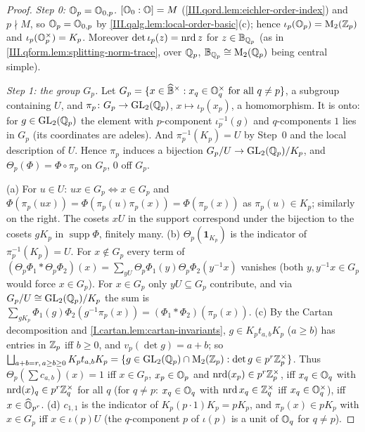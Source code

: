 \begin{theorem}
\end{theorem}
\begin{proof}
\emph{Step 0: $\mathbb{O}_p=\mathbb{O}_{0,p}$.} $[\mathbb{O}_0:\mathbb{O}]=M$ (\cref{III.qord.lem:eichler-order-index}) and $p\nmid M$, so $\mathbb{O}_p=\mathbb{O}_{0,p}$ by
\cref{III.qalg.lem:local-order-basic}(c); hence $\iota_p(\mathbb{O}_p)=\mathrm{M}_2(\mathbb{Z}_p)$ and $\iota_p(\mathbb{O}_p^\times)=K_p$. Moreover $\det\iota_p(z)=\operatorname{nrd} z$ for
$z\in\mathbb{B}_{\mathbb{Q}_p}$ (as in \cref{III.qform.lem:splitting-norm-trace}, over $\mathbb{Q}_p$, $\mathbb{B}_{\mathbb{Q}_p}\cong\mathrm{M}_2(\mathbb{Q}_p)$ being central simple).

\emph{Step 1: the group $G_p$.} Let $G_p=\{x\in\widehat{\mathbb{B}}^\times:x_q\in\mathbb{O}_q^\times\text{ for all }q\ne p\}$, a subgroup containing $U$, and
$\pi_p\colon G_p\to\mathrm{GL}_2(\mathbb{Q}_p)$, $x\mapsto\iota_p(x_p)$, a homomorphism. It is onto: for $g\in\mathrm{GL}_2(\mathbb{Q}_p)$ the element with $p$-component $\iota_p^{-1}(g)$ and
$q$-components $1$ lies in $G_p$ (its coordinates are adeles). And $\pi_p^{-1}(K_p)=U$ by Step~0 and the local description of $U$. Hence
$\pi_p$ induces a bijection $G_p/U\to\mathrm{GL}_2(\mathbb{Q}_p)/K_p$, and $\Theta_p(\Phi)=\Phi\circ\pi_p$ on $G_p$, $0$ off $G_p$.

(a) For $u\in U$: $ux\in G_p\iff x\in G_p$ and $\Phi(\pi_p(ux))=\Phi(\pi_p(u)\pi_p(x))=\Phi(\pi_p(x))$ as $\pi_p(u)\in K_p$; similarly on the right. The cosets
$xU$ in the support correspond under the bijection to the cosets $gK_p$ in $\operatorname{supp}\Phi$, finitely many. (b) $\Theta_p(\mathbf 1_{K_p})$ is the
indicator of $\pi_p^{-1}(K_p)=U$. For $x\notin G_p$ every term of $(\Theta_p\Phi_1*\Theta_p\Phi_2)(x)=\sum_{yU}\Theta_p\Phi_1(y)\Theta_p\Phi_2(y^{-1}x)$ vanishes
(both $y,y^{-1}x\in G_p$ would force $x\in G_p$). For $x\in G_p$ only $yU\subseteq G_p$ contribute, and via $G_p/U\cong\mathrm{GL}_2(\mathbb{Q}_p)/K_p$ the sum is
$\sum_{gK_p}\Phi_1(g)\Phi_2(g^{-1}\pi_p(x))=(\Phi_1*\Phi_2)(\pi_p(x))$. (c) By the Cartan decomposition and \cref{I.cartan.lem:cartan-invariants}, $g\in
K_pt_{a,b}K_p$ ($a\ge b$) has entries in $\mathbb{Z}_p$ iff $b\ge0$, and $v_p(\det g)=a+b$; so
$\bigsqcup_{a+b=r,\,a\ge b\ge0}K_pt_{a,b}K_p=\{g\in\mathrm{GL}_2(\mathbb{Q}_p)\cap\mathrm{M}_2(\mathbb{Z}_p):\det g\in p^r\mathbb{Z}_p^\times\}$. Thus $\Theta_p(\sum c_{a,b})(x)=1$ iff $x\in G_p$,
$x_p\in\mathbb{O}_p$ and $\operatorname{nrd}(x_p)\in p^r\mathbb{Z}_p^\times$, iff $x_q\in\mathbb{O}_q$ with $\operatorname{nrd}(x)_q\in p^r\mathbb{Z}_q^\times$ for all $q$ (for $q\ne p$: $x_q\in\mathbb{O}_q$ with
$\operatorname{nrd} x_q\in\mathbb{Z}_q^\times$ iff $x_q\in\mathbb{O}_q^\times$), iff $x\in\widehat{\mathbb{O}}_{p^r}$. (d) $c_{1,1}$ is the indicator of $K_p(p\cdot1)K_p=pK_p$, and $\pi_p(x)\in pK_p$ with $x\in G_p$
iff $x\in\iota(p)U$ (the $q$-component $p$ of $\iota(p)$ is a unit of $\mathbb{O}_q$ for $q\ne p$).
\end{proof}

